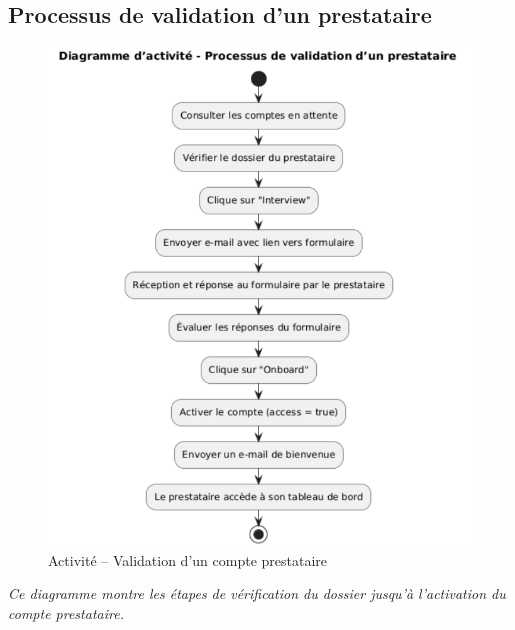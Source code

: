 \subsection*{Processus de validation d’un prestataire}
\begin{figure}[H]
\centering
\includegraphics[width=0.75\linewidth]{figures/validation prestataire act.png}
\caption{Activité – Validation d’un compte prestataire}
\end{figure}
\textit{Ce diagramme montre les étapes de vérification du dossier jusqu’à l’activation du compte prestataire.}


